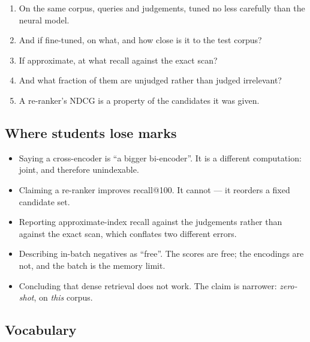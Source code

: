 \documentclass[11pt,a4paper]{article}
\begin{document}
\begin{enumerate}[leftmargin=*]
  \item {} On the same corpus, queries and
        judgements, tuned no less carefully than the neural model.
  \item {} And if fine-tuned, on what, and how
        close is it to the test corpus?
  \item {} If approximate, at what recall
        against the exact scan?
  \item {} And what fraction of them are
        unjudged rather than judged irrelevant?
  \item {} A re-ranker's NDCG is a property
        of the candidates it was given.
\end{enumerate}

\subsection{Where students lose marks}

\begin{itemize}[leftmargin=*,nosep]
  \item Saying a cross-encoder is ``a bigger bi-encoder''. It is a different
        computation: joint, and therefore unindexable.
  \item Claiming a re-ranker improves recall@100. It cannot --- it reorders a
        fixed candidate set.
  \item Reporting approximate-index recall against the judgements rather than
        against the exact scan, which conflates two different errors.
  \item Describing in-batch negatives as ``free''. The scores are free; the
        encodings are not, and the batch is the memory limit.
  \item Concluding that dense retrieval does not work. The claim is narrower:
        \emph{zero-shot}, on \emph{this} corpus.
\end{itemize}

\subsection{Vocabulary}
\end{document}
